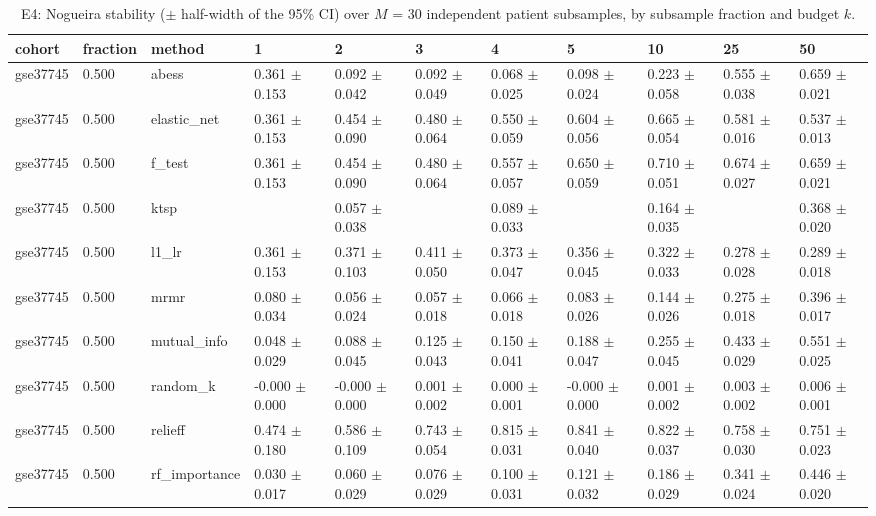 \begin{table}[t]
  \centering
  \caption{E4: Nogueira stability ($\pm$ half-width of the 95\% CI) over $M$ = 30 independent patient subsamples, by subsample fraction and budget $k$.}
  \label{tab:e4_nogueira}
  \small
  \begin{tabular}{lllllllllll}
    \toprule
    cohort & fraction & method & 1 & 2 & 3 & 4 & 5 & 10 & 25 & 50 \\
    \midrule
    gse37745 & 0.500 & abess & 0.361 $\pm$ 0.153 & 0.092 $\pm$ 0.042 & 0.092 $\pm$ 0.049 & 0.068 $\pm$ 0.025 & 0.098 $\pm$ 0.024 & 0.223 $\pm$ 0.058 & 0.555 $\pm$ 0.038 & 0.659 $\pm$ 0.021 \\
    gse37745 & 0.500 & elastic\_net & 0.361 $\pm$ 0.153 & 0.454 $\pm$ 0.090 & 0.480 $\pm$ 0.064 & 0.550 $\pm$ 0.059 & 0.604 $\pm$ 0.056 & 0.665 $\pm$ 0.054 & 0.581 $\pm$ 0.016 & 0.537 $\pm$ 0.013 \\
    gse37745 & 0.500 & f\_test & 0.361 $\pm$ 0.153 & 0.454 $\pm$ 0.090 & 0.480 $\pm$ 0.064 & 0.557 $\pm$ 0.057 & 0.650 $\pm$ 0.059 & 0.710 $\pm$ 0.051 & 0.674 $\pm$ 0.027 & 0.659 $\pm$ 0.021 \\
    gse37745 & 0.500 & ktsp &  & 0.057 $\pm$ 0.038 &  & 0.089 $\pm$ 0.033 &  & 0.164 $\pm$ 0.035 &  & 0.368 $\pm$ 0.020 \\
    gse37745 & 0.500 & l1\_lr & 0.361 $\pm$ 0.153 & 0.371 $\pm$ 0.103 & 0.411 $\pm$ 0.050 & 0.373 $\pm$ 0.047 & 0.356 $\pm$ 0.045 & 0.322 $\pm$ 0.033 & 0.278 $\pm$ 0.028 & 0.289 $\pm$ 0.018 \\
    gse37745 & 0.500 & mrmr & 0.080 $\pm$ 0.034 & 0.056 $\pm$ 0.024 & 0.057 $\pm$ 0.018 & 0.066 $\pm$ 0.018 & 0.083 $\pm$ 0.026 & 0.144 $\pm$ 0.026 & 0.275 $\pm$ 0.018 & 0.396 $\pm$ 0.017 \\
    gse37745 & 0.500 & mutual\_info & 0.048 $\pm$ 0.029 & 0.088 $\pm$ 0.045 & 0.125 $\pm$ 0.043 & 0.150 $\pm$ 0.041 & 0.188 $\pm$ 0.047 & 0.255 $\pm$ 0.045 & 0.433 $\pm$ 0.029 & 0.551 $\pm$ 0.025 \\
    gse37745 & 0.500 & random\_k & -0.000 $\pm$ 0.000 & -0.000 $\pm$ 0.000 & 0.001 $\pm$ 0.002 & 0.000 $\pm$ 0.001 & -0.000 $\pm$ 0.000 & 0.001 $\pm$ 0.002 & 0.003 $\pm$ 0.002 & 0.006 $\pm$ 0.001 \\
    gse37745 & 0.500 & relieff & 0.474 $\pm$ 0.180 & 0.586 $\pm$ 0.109 & 0.743 $\pm$ 0.054 & 0.815 $\pm$ 0.031 & 0.841 $\pm$ 0.040 & 0.822 $\pm$ 0.037 & 0.758 $\pm$ 0.030 & 0.751 $\pm$ 0.023 \\
    gse37745 & 0.500 & rf\_importance & 0.030 $\pm$ 0.017 & 0.060 $\pm$ 0.029 & 0.076 $\pm$ 0.029 & 0.100 $\pm$ 0.031 & 0.121 $\pm$ 0.032 & 0.186 $\pm$ 0.029 & 0.341 $\pm$ 0.024 & 0.446 $\pm$ 0.020 \\

\end{tabular}
\end{table}
